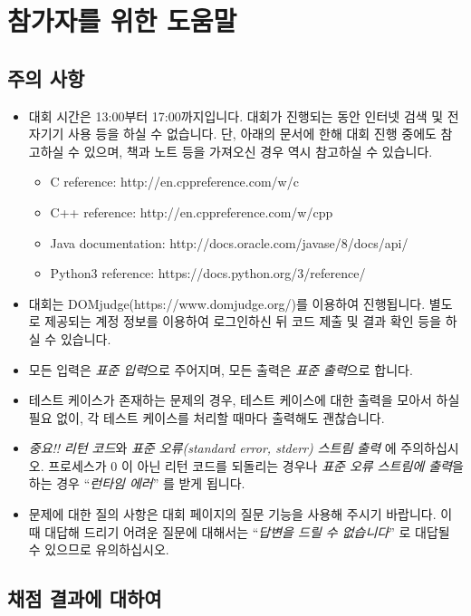 \section*{참가자를 위한 도움말}

\subsection*{주의 사항}

\begin{itemize}
\item 대회 시간은 13:00부터 17:00까지입니다. 대회가 진행되는 동안 인터넷 검색 및 전자기기 사용 등을 하실 수 없습니다. 단, 아래의 문서에 한해 대회 진행 중에도 참고하실 수 있으며, 책과 노트 등을 가져오신 경우 역시 참고하실 수 있습니다.
\begin{itemize}
  \item C reference: http://en.cppreference.com/w/c
  \item C++ reference: http://en.cppreference.com/w/cpp
  \item Java documentation: http://docs.oracle.com/javase/8/docs/api/
  \item Python3 reference: https://docs.python.org/3/reference/
\end{itemize}
\item 대회는 DOMjudge(https://www.domjudge.org/)를 이용하여 진행됩니다. 별도로 제공되는 계정 정보를 이용하여 로그인하신 뒤 코드 제출 및 결과 확인 등을 하실 수 있습니다.
\item 모든 입력은 \emph{표준 입력}으로 주어지며, 모든 출력은 \emph{표준 출력}으로 합니다.
\item 테스트 케이스가 존재하는 문제의 경우, 테스트 케이스에 대한 출력을 모아서 하실 필요 없이, 각 테스트 케이스를 처리할 때마다 출력해도 괜찮습니다.
\item \emph{중요!!} \emph{리턴 코드}와 \emph{표준 오류(standard error, stderr) 스트림 출력} 에 주의하십시오. 프로세스가 $0$ 이 아닌 리턴 코드를 되돌리는 경우나 \emph{표준 오류 스트림에 출력}을 하는 경우 ``\emph{런타임 에러}'' 를 받게 됩니다.
\item 문제에 대한 질의 사항은 대회 페이지의 질문 기능을 사용해 주시기 바랍니다. 이 때 대답해 드리기 어려운 질문에 대해서는 ``\emph{답변을 드릴 수 없습니다}'' 로 대답될 수 있으므로 유의하십시오.
\end{itemize}

\subsection*{채점 결과에 대하여}

